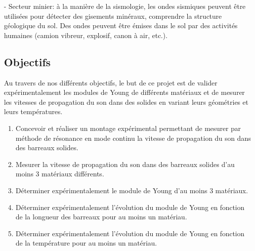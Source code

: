 - Secteur minier:
à la manière de la sismologie, les ondes sismiques peuvent être utilisées pour
détecter des gisements minéraux, comprendre la structure géologique du sol.
Des ondes peuvent être émises dans le sol par des activités humaines (camion
vibreur, explosif, canon à air, etc.).~\cite{wikipedia-imagerie-sismique}


\newpage

\subsection{Objectifs}
Au travers de nos différents objectifs, le but de ce projet est de valider
expérimentalement les modules de Young de différents matériaux et de mesurer
les vitesses de propagation du son dans des solides en variant leurs
géométries et leurs températures.\\
\begin{enumerate}
    \item Concevoir et réaliser un montage expérimental permettant 
    de mesurer par méthode de résonance en mode continu la vitesse 
    de propagation du son dans des barreaux solides.
    \item Mesurer la vitesse de propagation du son dans des barreaux 
    solides d'au moins 3 matériaux différents.
    \item Déterminer expérimentalement le module de Young d'au moins
    3 matériaux.
    \item Déterminer expérimentalement l'évolution du module de Young 
    en fonction de la longueur des barreaux pour au moins un matériau.
    \item Déterminer expérimentalement l'évolution du module de Young 
    en fonction de la température pour au moins un matériau.
\end{enumerate}

